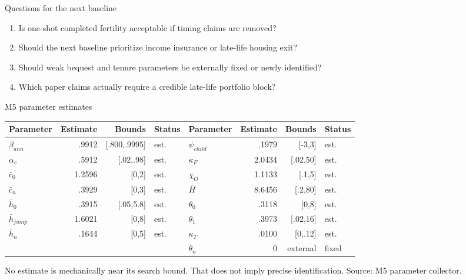 \documentclass[aspectratio=169,11pt]{beamer}
\newcommand{\source}[1]{\vfill{\color{Muted}\tiny Source: #1}}
\begin{document}
\begin{frame}{Questions for the next baseline}
  \large
  \begin{enumerate}
    \setlength{\itemsep}{1.05em}
    \item Is one-shot completed fertility acceptable if timing claims are removed?
    \item Should the next baseline prioritize income insurance or late-life housing exit?
    \item Should weak bequest and tenure parameters be externally fixed or newly identified?
    \item Which paper claims actually require a credible late-life portfolio block?
  \end{enumerate}
\end{frame}

\appendix

\begin{frame}{M5 parameter estimates}
\scriptsize
\centering
\begin{tabular}{lrrl@{\qquad}lrrl}
\toprule
Parameter & Estimate & Bounds & Status & Parameter & Estimate & Bounds & Status\\
\midrule
$\beta_{ann}$ & .9912 & [.800,.9995] & est. & $\psi_{child}$ & .1979 & [-3,3] & est.\\
$\alpha_c$ & .5912 & [.02,.98] & est. & $\kappa_F$ & 2.0434 & [.02,50] & est.\\
$\bar c_0$ & 1.2596 & [0,2] & est. & $\chi_O$ & 1.1133 & [.1,5] & est.\\
$\bar c_n$ & .3929 & [0,3] & est. & $\bar H$ & 8.6456 & [.2,80] & est.\\
$\bar h_0$ & .3915 & [.05,5.8] & est. & $\theta_0$ & .3118 & [0,8] & est.\\
$\bar h_{jump}$ & 1.6021 & [0,8] & est. & $\theta_1$ & .3973 & [.02,16] & est.\\
$\bar h_n$ & .1644 & [0,5] & est. & $\kappa_T$ & .0100 & [0,.12] & est.\\
&&&& $\theta_n$ & 0 & external & fixed\\
\bottomrule
\end{tabular}

\vspace{0.8em}
No estimate is mechanically near its search bound. That does not imply precise identification.
\source{M5 parameter collector.}
\end{frame}
\end{document}

